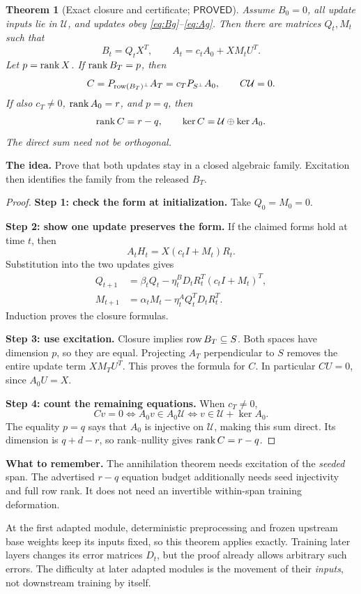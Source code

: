 \documentclass[12pt,a4paper]{article}
\theoremstyle{readable}
\newtheorem{theorem}{Theorem}[section]
\theoremstyle{definition}\newtheorem{example}[theorem]{Example}
\newcommand{\PP}{\mathsf{PROVED}}\newcommand{\FF}{\mathsf{FALSE}}
\newcommand{\idea}[1]{\par\textbf{The idea.} #1\par}
\newcommand{\takeaway}[1]{\par\textbf{What to remember.} #1\par}
\begin{document}
\begin{theorem}[Exact closure and certificate; \(\PP\)]\label{thm:exact}
Assume \(B_0=0\), all update inputs lie in \(\mathcal U\), and updates obey \eqref{eq:Bg}--\eqref{eq:Ag}. Then there are matrices \(Q_t,M_t\) such that
\[
B_t=Q_tX^T,\qquad A_t=c_tA_0+XM_tU^T.
\]
Let \(p=\operatorname{rank} X\). If \(\operatorname{rank} B_T=p\), then
\[
C=P_{\operatorname{row}(B_T)^\perp}A_T=c_TP_{S^\perp}A_0,
\qquad C\mathcal U=0.
\]
If also \(c_T\ne0\), \(\operatorname{rank} A_0=r\), and \(p=q\), then
\[
\operatorname{rank} C=r-q,\qquad \ker C=\mathcal U\oplus\ker A_0.
\]
The direct sum need not be orthogonal.
\end{theorem}
\idea{Prove that both updates stay in a closed algebraic family. Excitation then identifies the family from the released \(B_T\).}
\begin{proof}
\textbf{Step 1: check the form at initialization.} Take \(Q_0=M_0=0\).

\textbf{Step 2: show one update preserves the form.} If the claimed forms hold at time \(t\), then
\[
A_tH_t=X(c_tI+M_t)R_t.
\]
Substitution into the two updates gives
\begin{align*}
Q_{t+1}&=\beta_tQ_t-\eta_t^BD_tR_t^T(c_tI+M_t)^T,\\
M_{t+1}&=\alpha_tM_t-\eta_t^AQ_t^TD_tR_t^T.
\end{align*}
Induction proves the closure formulas.

\textbf{Step 3: use excitation.} Closure implies \(\operatorname{row} B_T\subseteq S\). Both spaces have dimension \(p\), so they are equal. Projecting \(A_T\) perpendicular to \(S\) removes the entire update term \(XM_TU^T\). This proves the formula for \(C\). In particular \(CU=0\), since \(A_0U=X\).

\textbf{Step 4: count the remaining equations.} When \(c_T\ne0\),
\[
Cv=0\iff A_0v\in A_0\mathcal U
\iff v\in\mathcal U+\ker A_0.
\]
The equality \(p=q\) says that \(A_0\) is injective on \(\mathcal U\), making this sum direct. Its dimension is \(q+d-r\), so rank--nullity gives \(\operatorname{rank} C=r-q\).
\end{proof}
\takeaway{The annihilation theorem needs excitation of the \emph{seeded} span. The advertised \(r-q\) equation budget additionally needs seed injectivity and full row rank. It does not need an invertible within-span training deformation.}

At the first adapted module, deterministic preprocessing and frozen upstream base weights keep its inputs fixed, so this theorem applies exactly. Training later layers changes its error matrices \(D_t\), but the proof already allows arbitrary such errors. The difficulty at later adapted modules is the movement of their \emph{inputs}, not downstream training by itself.
\end{document}

